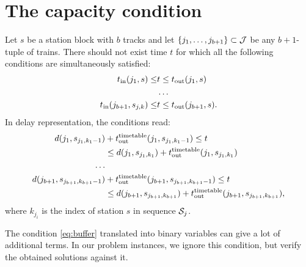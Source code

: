 \section{The capacity condition}
Let $s$ be a station block with $b$ tracks and let $\{j_{1},\ldots,j_{b+1}\} \subset \mathcal{J}$ be any $b+1$-tuple of
trains. There should not exist time $t$ for which all the following conditions are simultaneously satisfied:
\begin{equation}
  \begin{split}
    t_\text{in}(j_{1}, s) \le &t \le t_\text{out}(j_{1}, s) \\
    &\ldots \\
    t_\text{in}(j_{b+1}, s_{j,k}) \le &t \le t_\text{out}(j_{b+1}, s).
  \end{split}
\end{equation}
In delay representation, the conditions read:
\begin{equation}
  \label{eq:buffer}
  \begin{split}
    d(j_{1}, s_{j_{1},k_{1}-1}) &+ t_\text{out}^\text{timetable}(j_{1},s_{j_{1},k_{1}-1}) \le t \\
                            &\le d(j_{1},s_{j_{1},k_{1}}) + t_\text{out}^\text{timetable}(j_{1},s_{j_{1},k_{1}})\\
    \ldots \\
    d(j_{b+1}, s_{j_{b+1},k_{b+1}-1}) &+ t_\text{out}^\text{timetable}(j_{b+1},s_{j_{b+1},k_{b+1}-1}) \le t \\
                            &\le d(j_{b+1},s_{j_{b+1},k_{b+1}}) + t_\text{out}^\text{timetable}(j_{b+1},s_{j_{b+1},k_{b+1}}),
  \end{split}
\end{equation}
where $k_{j_{i}}$ is the index of station $s$ in sequence $\mathcal{S}_j$.

The condition \eqref{eq:buffer} translated into binary variables can give a lot of additional terms.
In our problem instances, we ignore this condition, but verify the obtained solutions against it.
